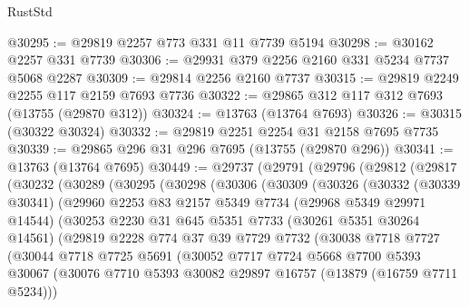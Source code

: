 \begin{lexlean}{RustStd}
\begin{coremodule}
@30295 := @29819 @2257 @773 @331 @11 @7739 @5194
@30298 := @30162 @2257 @331 @7739
@30306 := @29931 @379 @2256 @2160 @331 @5234 @7737 @5068 @2287
@30309 := @29814 @2256 @2160 @7737
@30315 := @29819 @2249 @2255 @117 @2159 @7693 @7736
@30322 := @29865 @312 @117 @312 @7693 (@13755 (@29870 @312))
@30324 := @13763 (@13764 @7693)
@30326 := @30315 (@30322 @30324)
@30332 := @29819 @2251 @2254 @31 @2158 @7695 @7735
@30339 := @29865 @296 @31 @296 @7695 (@13755 (@29870 @296))
@30341 := @13763 (@13764 @7695)
@30449 := @29737
    (@29791
      (@29796
        (@29812
          (@29817
            (@30232
              (@30289
                (@30295
                  (@30298
                    (@30306
                      (@30309
                        (@30326
                          (@30332
                            (@30339 @30341)
                            (@29960
                              @2253
                              @83
                              @2157
                              @5349
                              @7734
                              (@29968 @5349 @29971 @14544)
                              (@30253
                                @2230
                                @31
                                @645
                                @5351
                                @7733
                                (@30261 @5351 @30264 @14561)
                                (@29819
                                  @2228
                                  @774
                                  @37
                                  @39
                                  @7729
                                  @7732
                                  (@30038
                                    @7718
                                    @7727
                                    (@30044
                                      @7718
                                      @7725
                                      @5691
                                      (@30052
                                        @7717
                                        @7724
                                        @5668
                                        @7700
                                        @5393
                                        @30067
                                        (@30076
                                          @7710
                                          @5393
                                          @30082
                                          @29897
                                          @16757
                                          (@13879 (@16759 @7711 @5234)))

\end{coremodule}
\end{lexlean}
